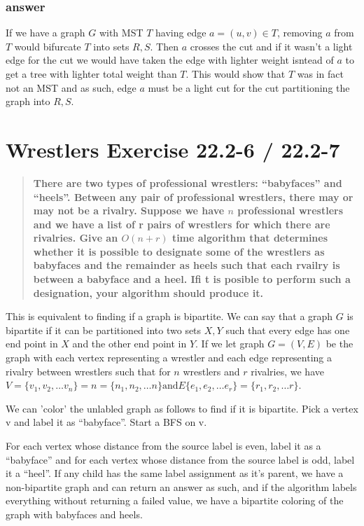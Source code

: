 \documentclass[titlepage]{article}\usepackage[]{graphicx}\usepackage[]{color}
\begin{document}
\subsubsection{answer}
If we have a graph $G$ with MST $T$ having edge $a = (u,v) \in T$, removing $a$
from $T$ would bifurcate $T$ into sets $R,S$. Then $a$ crosses the cut and if
it wasn't a light edge for the cut we would have taken the edge with lighter
weight isntead of $a$ to get a tree with lighter total weight than $T$. This
would show that $T$ was in fact not an MST and as such, edge $a$ must be a
light cut for the cut partitioning the graph into $R,S$. 




\section{Wrestlers Exercise 22.2-6 / 22.2-7 } 
\begin{quote}
  \textbf{There are two types of professional wrestlers: ``babyfaces'' and
  ``heels''. Between any pair of professional wrestlers, there may or may not
be a rivalry. Suppose we have $n$ professional wrestlers and we have a list of
r pairs of wrestlers for which there are rivalries. Give an $O(n + r)$ time
algorithm that determines whether it is possible to designate some of the
wrestlers as babyfaces and the remainder as heels such that each rvailry is
between a babyface and a heel. Ifi t is posible to perform such a designation,
your algorithm should produce it.}
\end{quote}

This is equivalent to finding if a graph is bipartite. We can say that a graph
$G$ is bipartite if it can be partitioned into two sets $X,Y$ such that every
edge has one end point in $X$ and the other end point in $Y$. 
If we let graph $G = (V,E)$ be the graph with each vertex representing a
wrestler and each edge representing a rivalry between wrestlers such that for
$n$ wrestlers and $r$ rivalries, we have 
$V = \{v_1, v_2, \dots v_n\} = n = \{n_1, n_2, \dots n\} \text{and} E \{e_1, e_2, \dots e_r\} = \{r_1, r_2, \dots r \}$.  

We can 'color' the unlabled graph as follows to find if it is bipartite. Pick a
vertex v and label it as ``babyface''. Start a BFS on v. 

For each vertex whose distance from the source label is even, label it as a
``babyface'' and for each vertex whose distance from the source label is odd, label
it a ``heel''. If any child has the same label assignment as it's parent, we
have a non-bipartite graph and can return an answer as such, and if the
algorithm labels everything without returning a failed value, we have a
bipartite coloring of the graph with babyfaces and heels.
\end{document}
